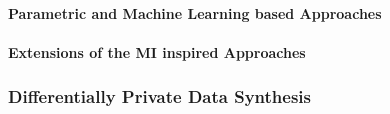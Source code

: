 \paragraph{Parametric and Machine Learning based Approaches}

\paragraph{Extensions of the MI inspired Approaches}


\subsubsection{Differentially Private Data Synthesis}
\label{subsubsec:dpds}



